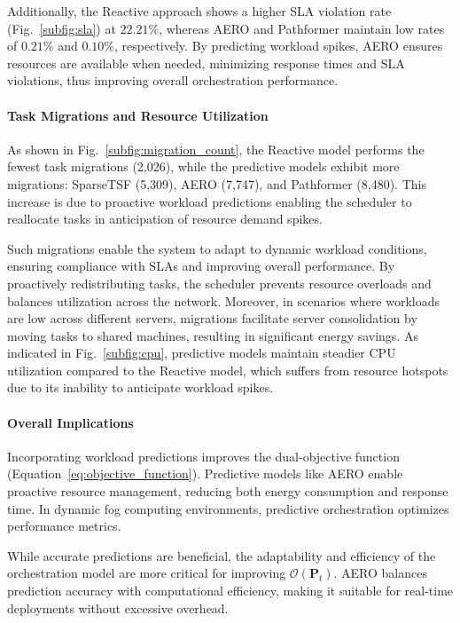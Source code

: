 Additionally, the Reactive approach shows a higher \ac{SLA} violation rate (Fig.~\ref{subfig:sla}) at $22.21\%$, whereas \ac{AERO} and Pathformer maintain low rates of $0.21\%$ and $0.10\%$, respectively. By predicting workload spikes, \ac{AERO} ensures resources are available when needed, minimizing response times and \ac{SLA} violations, thus improving overall orchestration performance.

\paragraph*{Task Migrations and Resource Utilization}

As shown in Fig.~\ref{subfig:migration_count}, the Reactive model performs the fewest task migrations (2,026), while the predictive models exhibit more migrations: \ac{SparseTSF} (5,309), \ac{AERO} (7,747), and Pathformer (8,480). This increase is due to proactive workload predictions enabling the scheduler to reallocate tasks in anticipation of resource demand spikes.

Such migrations enable the system to adapt to dynamic workload conditions, ensuring compliance with \acp{SLA} and improving overall performance. By proactively redistributing tasks, the scheduler prevents resource overloads and balances utilization across the network. Moreover, in scenarios where workloads are low across different servers, migrations facilitate server consolidation by moving tasks to shared machines, resulting in significant energy savings. As indicated in Fig.~\ref{subfig:cpu}, predictive models maintain steadier \ac{CPU} utilization compared to the Reactive model, which suffers from resource hotspots due to its inability to anticipate workload spikes.


\paragraph*{Overall Implications}

Incorporating workload predictions improves the dual-objective function (Equation~\eqref{eq:objective_function}). Predictive models like \ac{AERO} enable proactive resource management, reducing both energy consumption and response time. In dynamic fog computing environments, predictive orchestration optimizes performance metrics.

While accurate predictions are beneficial, the adaptability and efficiency of the orchestration model are more critical for improving $\mathcal{O}(\mathbf{P}_t)$. \ac{AERO} balances prediction accuracy with computational efficiency, making it suitable for real-time deployments without excessive overhead.
